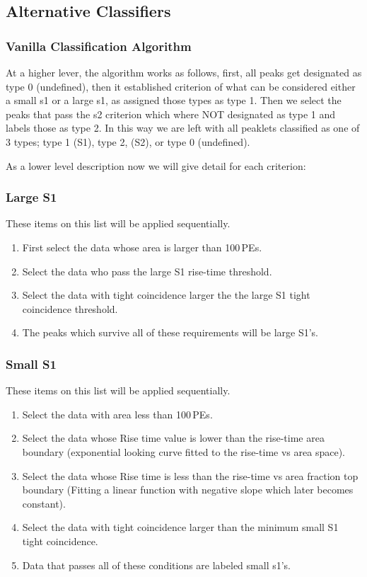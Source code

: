 \subsection{Alternative Classifiers}

\subsubsection{Vanilla Classification Algorithm}
\label{sec:Vanilla_algo}

At a higher lever, the algorithm works as follows, first, all peaks get designated as type 0 (undefined), then it established criterion of what can be considered either a small s1 or a large s1, as assigned those types as type 1. Then we select the peaks that pass the s2 criterion which where NOT designated as type 1 and labels those as type 2. In this way we are left with all peaklets classified as one of 3 types; type 1 (S1), type 2, (S2), or type 0 (undefined).

As a lower level description now we will give detail for each criterion:

\subsubsection*{Large S1}

These items on this list will be applied sequentially.
\begin{enumerate}
    \item First select the data whose area is larger than 100\,PEs.
    \item Select the data who pass the large S1 rise-time threshold.
    \item Select the data with tight coincidence larger the the large S1 tight coincidence threshold.
    \item The peaks which survive all of these requirements will be large S1's.
\end{enumerate}

\subsubsection*{Small S1}

These items on this list will be applied sequentially.

\begin{enumerate}
    \item Select the data with area less than 100\,PEs.
    \item Select the data whose Rise time value is lower than the rise-time area boundary (exponential looking curve fitted to the rise-time vs area space).
    \item Select the data whose Rise time is less than the rise-time vs area fraction top boundary (Fitting a linear function with negative slope which later becomes constant).
    \item Select the data with tight coincidence larger than the minimum small S1 tight coincidence. 
    \item Data that passes all of these conditions are labeled small s1's.
\end{enumerate}

